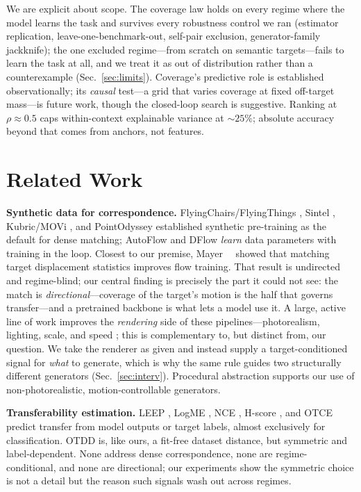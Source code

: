 \documentclass[runningheads]{llncs}
\begin{document}
We are explicit about scope. The coverage law holds on every regime where the
model learns the task and survives every robustness control we ran (estimator
replication, leave-one-benchmark-out, self-pair exclusion, generator-family
jackknife); the one excluded regime---from scratch on semantic targets---fails
to learn the task at all, and we treat it as out of distribution rather than a
counterexample (Sec.~\ref{sec:limits}). Coverage's predictive role is
established observationally; its \emph{causal} test---a grid that varies
coverage at fixed off-target mass---is future work, though the closed-loop
search is suggestive. Ranking at $\rho{\approx}0.5$ caps within-context
explainable variance at ${\sim}25\%$; absolute accuracy beyond that comes from
anchors, not features.

\section{Related Work}
\label{sec:related}

\noindent\textbf{Synthetic data for correspondence.}
FlyingChairs/FlyingThings \cite{mayer2016FlyingThingsDataset}, Sintel
\cite{sintel}, Kubric/MOVi \cite{greff2021kubric}, and PointOdyssey
\cite{pointodyssey} established synthetic pre-training as the default for
dense matching; AutoFlow \cite{sun2021autoflow} and DFlow \cite{im2022dflow}
\emph{learn} data parameters with training in the loop. Closest to our
premise, Mayer~\etal~\cite{mayer2018what} showed that matching target
displacement statistics improves flow training. That result is undirected and
regime-blind; our central finding is precisely the part it could not see: the
match is \emph{directional}---coverage of the target's motion is the half that
governs transfer---and a pretrained backbone is what lets a model use it.
A large, active line of work improves the \emph{rendering} side of these
pipelines---photorealism, lighting, scale, and speed
\cite{greff2021kubric,pointodyssey}; this is complementary to, but distinct
from, our question. We take the renderer as given and instead supply a
target-conditioned signal for \emph{what} to generate, which is why the same
rule guides two structurally different generators (Sec.~\ref{sec:interv}).
Procedural abstraction \cite{Baradad2021LookingAtNoise,white2009mandelbulb}
supports our use of non-photorealistic, motion-controllable generators.

\noindent\textbf{Transferability estimation.}
LEEP \cite{nguyen2020leep}, LogME \cite{you2021logme}, NCE
\cite{tran2019transferability}, H-score \cite{bao2019information}, and OTCE
\cite{tan2021otce} predict transfer from model outputs or target labels,
almost exclusively for classification. OTDD \cite{alvarez2020geometric} is,
like ours, a fit-free dataset distance, but symmetric and label-dependent.
None address dense correspondence, none are regime-conditional, and none are
directional; our experiments show the symmetric choice is not a detail but
the reason such signals wash out across regimes.
\end{document}

